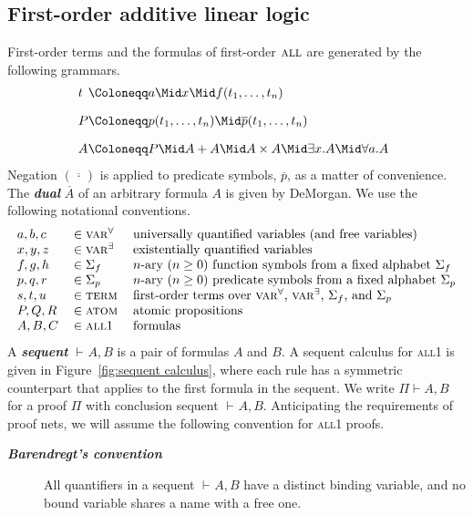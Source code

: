 \documentclass[UKenglish]{lipics-v2016}
\theoremstyle{plain}
\newcommand\defn[1]{\textit{\textbf{#1}}}
\newcommand\varA{\textsc{var}^\forall}
\newcommand\varE{\textsc{var}^\exists}
\newcommand\terms{\textsc{term}}
\newcommand\termsA{\textsc{term}^\forall}
\newcommand\atom{\textsc{atom}}
\newcommand\all{\textsc{all}}
\newcommand\+{+}
\renewcommand\*{\times}
\newcommand\dual[1]{\overline{#1}}
\newcommand\seq[3][]{{\vdash_{#1}}#2,#3}
\newcommand\prf[3]{#1\vdash\!#2,#3}
\begin{document}


\subsection{First-order additive linear logic}

First-order terms and the formulas of first-order $\all$ are generated by the following grammars.
%
\setMidspace{5pt}
\[
\begin{array}{@{}l@{}l}
	t &\Coloneqq a \Mid x \Mid f(t_1,\dots,t_n)
\\[10pt]
	P &\Coloneqq p(t_1,\dots,t_n) \Mid \dual p(t_1,\dots,t_n)
\\[10pt]
	A &\Coloneqq P \Mid A\+A \Mid A\*A \Mid \exists x.A \Mid \forall a.A
\end{array}
\]
%
Negation $(\dual{\,\cdot\,})$ is applied to predicate symbols, $\dual p$, as a matter of convenience. The \defn{dual} $\dual A$ of an arbitrary formula $A$ is given by DeMorgan. We use the following notational conventions.
%
\[
\begin{tabular}{@{}lll@{}}
	$a,b,c$ & $\in \varA$ 		& universally quantified variables (and free variables)\\
	$x,y,z$ & $\in \varE$		& existentially quantified variables \\
	$f,g,h$ & $\in \Sigma_f$	& $n$-ary $(n\geq 0)$ function symbols from a fixed alphabet $\Sigma_f$\\
	$p,q,r$ & $\in \Sigma_p$	& $n$-ary $(n\geq 0)$ predicate symbols from a fixed alphabet $\Sigma_p$ \\
	$s,t,u$ & $\in \terms$ 		& first-order terms over $\varA$, $\varE$, $\Sigma_f$, and $\Sigma_p$ \\
	$P,Q,R$ & $\in \atom$		& atomic propositions \\
	$A,B,C$ & $\in \all1$		& formulas \\
\end{tabular}
\]
%
A \defn{sequent} $\seq AB$ is a pair of formulas $A$ and $B$. A sequent calculus for \all1 is given in Figure~\ref{fig:sequent calculus}, where each rule has a symmetric counterpart that applies to the first formula in the sequent. We write $\prf\Pi AB$ for a proof $\Pi$ with conclusion sequent $\seq AB$. Anticipating the requirements of proof nets, we will assume the following convention for \all1 proofs.

\begin{description}
	\item
[\defn{Barendregt's convention}] All quantifiers in a sequent $\seq AB$ have a distinct binding variable, and no bound variable shares a name with a free one.
\end{description}
\end{document}
